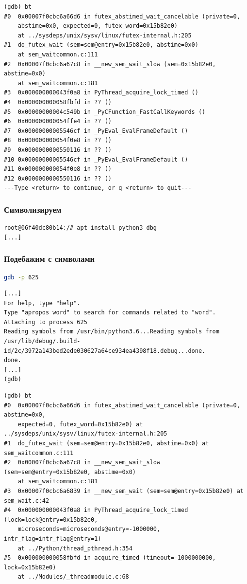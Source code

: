\documentclass[10pt,pdf,utf8,aspectratio=169,xcolor=dvipsnames,x11names,center]{beamer}
\begin{document}
\begin{frame}[fragile]
  \begin{lstlisting}[language={}]
(gdb) bt
#0  0x00007f0cbc6a66d6 in futex_abstimed_wait_cancelable (private=0, 
    abstime=0x0, expected=0, futex_word=0x15b82e0)
    at ../sysdeps/unix/sysv/linux/futex-internal.h:205
#1  do_futex_wait (sem=sem@entry=0x15b82e0, abstime=0x0)
    at sem_waitcommon.c:111
#2  0x00007f0cbc6a67c8 in __new_sem_wait_slow (sem=0x15b82e0, abstime=0x0)
    at sem_waitcommon.c:181
#3  0x000000000043f0a8 in PyThread_acquire_lock_timed ()
#4  0x000000000058fbfd in ?? ()
#5  0x00000000004c549b in _PyCFunction_FastCallKeywords ()
#6  0x000000000054ffe4 in ?? ()
#7  0x00000000005546cf in _PyEval_EvalFrameDefault ()
#8  0x000000000054f0e8 in ?? ()
#9  0x0000000000550116 in ?? ()
#10 0x00000000005546cf in _PyEval_EvalFrameDefault ()
#11 0x000000000054f0e8 in ?? ()
#12 0x0000000000550116 in ?? ()
---Type <return> to continue, or q <return> to quit---
  \end{lstlisting}
\end{frame}

\begin{frame}[fragile]
  \frametitle{Символизируем}
  \begin{lstlisting}[language={}]
root@06f40dc80b14:/# apt install python3-dbg
[...]
  \end{lstlisting}
\end{frame}

\begin{frame}[fragile]
  \frametitle{Подебажим с символами}
  \begin{lstlisting}[language=bash]
gdb -p 625
  \end{lstlisting}
  \begin{lstlisting}[language={}]
[...]
For help, type "help".
Type "apropos word" to search for commands related to "word".
Attaching to process 625
Reading symbols from /usr/bin/python3.6...Reading symbols from /usr/lib/debug/.build-id/2c/3972a143bed2ede030627a64ce934ea4398f18.debug...done.
done.
[...]
(gdb)
  \end{lstlisting}
\end{frame}

\begin{frame}[fragile]
  \begin{lstlisting}[language={}]
(gdb) bt
#0  0x00007f0cbc6a66d6 in futex_abstimed_wait_cancelable (private=0, abstime=0x0, 
    expected=0, futex_word=0x15b82e0) at ../sysdeps/unix/sysv/linux/futex-internal.h:205
#1  do_futex_wait (sem=sem@entry=0x15b82e0, abstime=0x0) at sem_waitcommon.c:111
#2  0x00007f0cbc6a67c8 in __new_sem_wait_slow (sem=sem@entry=0x15b82e0, abstime=0x0)
    at sem_waitcommon.c:181
#3  0x00007f0cbc6a6839 in __new_sem_wait (sem=sem@entry=0x15b82e0) at sem_wait.c:42
#4  0x000000000043f0a8 in PyThread_acquire_lock_timed (lock=lock@entry=0x15b82e0, 
    microseconds=microseconds@entry=-1000000, intr_flag=intr_flag@entry=1)
    at ../Python/thread_pthread.h:354
#5  0x000000000058fbfd in acquire_timed (timeout=-1000000000, lock=0x15b82e0)
    at ../Modules/_threadmodule.c:68
  \end{lstlisting}
\end{frame}
\end{document}
